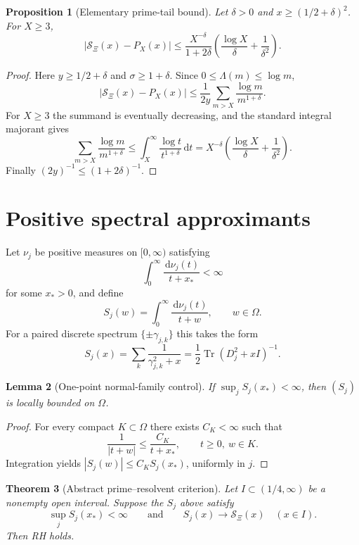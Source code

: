 \documentclass[11pt]{article}
\newtheorem{theorem}{Theorem}[section]
\newtheorem{proposition}[theorem]{Proposition}
\newtheorem{lemma}[theorem]{Lemma}
\theoremstyle{definition}
\newcommand{\XiR}{\mathcal S_{\Xi}}
\newcommand{\dd}{\,\mathrm d}
\newcommand{\Tr}{\operatorname{Tr}}
\begin{document}
\begin{proposition}[Elementary prime-tail bound]\label{prop:prime-tail}
Let $\delta>0$ and $x\ge(1/2+\delta)^2$. For $X\ge3$,
\begin{equation}\label{eq:tail-bound}
 |\XiR(x)-P_X(x)|
 \le
 \frac{X^{-\delta}}{1+2\delta}
 \left(\frac{\log X}{\delta}+\frac{1}{\delta^2}\right).
\end{equation}
\end{proposition}

\begin{proof}
Here $y\ge1/2+\delta$ and $\sigma\ge1+\delta$. Since
$0\le\Lambda(m)\le\log m$,
\[
 |\XiR(x)-P_X(x)|
 \le\frac{1}{2y}\sum_{m>X}\frac{\log m}{m^{1+\delta}}.
\]
For $X\ge3$ the summand is eventually decreasing, and the standard integral majorant gives
\[
 \sum_{m>X}\frac{\log m}{m^{1+\delta}}
 \le\int_X^\infty\frac{\log t}{t^{1+\delta}}\dd t
 =X^{-\delta}\left(\frac{\log X}{\delta}+\frac1{\delta^2}\right).
\]
Finally $(2y)^{-1}\le(1+2\delta)^{-1}$.
\end{proof}

\section{Positive spectral approximants}

Let $\nu_j$ be positive measures on $[0,\infty)$ satisfying
\[
 \int_0^\infty\frac{\dd\nu_j(t)}{t+x_*}<\infty
\]
for some $x_*>0$, and define
\[
 S_j(w)=\int_0^\infty\frac{\dd\nu_j(t)}{t+w},\qquad w\in\Omega.
\]
For a paired discrete spectrum $\{\pm\gamma_{j,k}\}$ this takes the form
\[
 S_j(x)=\sum_k\frac{1}{\gamma_{j,k}^2+x}
 =\frac12\Tr(D_j^2+xI)^{-1}.
\]

\begin{lemma}[One-point normal-family control]\label{lem:one-point-control}
If $\sup_jS_j(x_*)<\infty$, then $(S_j)$ is locally bounded on $\Omega$.
\end{lemma}

\begin{proof}
For every compact $K\subset\Omega$ there exists $C_K<\infty$ such that
\[
 \frac1{|t+w|}\le\frac{C_K}{t+x_*},
 \qquad t\ge0,\ w\in K.
\]
Integration yields $|S_j(w)|\le C_KS_j(x_*)$, uniformly in $j$.
\end{proof}

\begin{theorem}[Abstract prime--resolvent criterion]\label{thm:abstract-resolvent}
Let $I\subset(1/4,\infty)$ be a nonempty open interval. Suppose the $S_j$ above satisfy
\[
 \sup_jS_j(x_*)<\infty
 \qquad\text{and}\qquad
 S_j(x)\longrightarrow\XiR(x)\quad(x\in I).
\]
Then RH holds.
\end{theorem}
\end{document}
